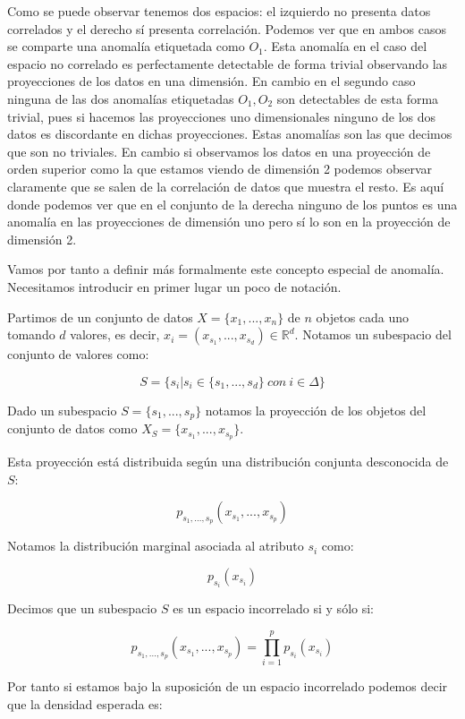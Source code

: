 Como se puede observar tenemos dos espacios: el izquierdo no presenta datos correlados y el derecho sí presenta correlación. Podemos ver que en ambos casos se comparte una anomalía etiquetada como $O_1$. Esta anomalía en el caso del espacio no correlado es perfectamente detectable de forma trivial observando las proyecciones de los datos en una dimensión. En cambio en el segundo caso ninguna de las dos anomalías etiquetadas $O_1 , O_2$ son detectables de esta forma trivial, pues si hacemos las proyecciones uno dimensionales ninguno de los dos datos es discordante en dichas proyecciones. Estas anomalías son las que decimos que son no triviales. En cambio si observamos los datos en una proyección de orden superior como la que estamos viendo de dimensión 2 podemos observar claramente que se salen de la correlación de datos que muestra el resto. Es aquí donde podemos ver que en el conjunto de la derecha ninguno de los puntos es una anomalía en las proyecciones de dimensión uno pero sí lo son en la proyección de dimensión 2.

Vamos por tanto a definir más formalmente este concepto especial de anomalía. Necesitamos introducir en primer lugar un poco de notación.

Partimos de un conjunto de datos $X = \{ x_1 , ... , x_n \}$ de $n$ objetos cada uno tomando $d$ valores, es decir, $x_i = (x_{s_1} , ... , x_{s_d}) \in \mathbb{R}^d$. Notamos un subespacio del conjunto de valores como:

$$S = \{ s_i | s_i \in \{ s_1 , ... , s_d \} \ con \ i\in \Delta \}$$

Dado un subespacio $S = \{ s_1 , ... , s_p \}$ notamos la proyección de los objetos del conjunto de datos como $X_{S} = \{ x_{s_1} , ... , x_{s_p} \}$.

Esta proyección está distribuida según una distribución conjunta desconocida de $S$:

$$p_{s_1 , ... , s_p} (x_{s_1} , ... , x_{s_p})$$

Notamos la distribución marginal asociada al atributo $s_i$ como:

$$p_{s_i}(x_{s_i})$$

\begin{definicion}
	Decimos que un subespacio $S$ es un espacio incorrelado si y sólo si:
	
	$$p_{s_1 , ... , s_p}(x_{s_1} , ... , x_{s_p}) = \prod_{i=1}^{p}p_{s_i}(x_{s_i})$$
\end{definicion}

Por tanto si estamos bajo la suposición de un espacio incorrelado podemos decir que la densidad esperada es:

